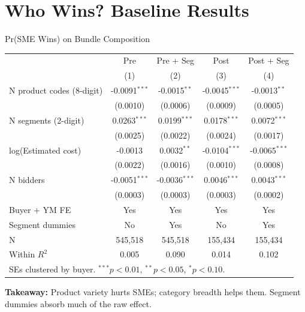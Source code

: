 \documentclass[9pt,aspectratio=169]{beamer}
\begin{document}
\section{Who Wins? Baseline Results}


\begin{frame}{Pr(SME Wins) on Bundle Composition}
\centering\small
\begin{tabular}{lcccc}
\toprule
 & Pre & Pre + Seg & Post & Post + Seg \\
 & (1) & (2) & (3) & (4) \\
\midrule
N product codes (8-digit) & -0.0091$^{***}$ & -0.0015$^{**}$ & -0.0045$^{***}$ & -0.0013$^{**}$ \\
 & (0.0010) & (0.0006) & (0.0009) & (0.0005) \\[2pt]
N segments (2-digit) & 0.0263$^{***}$ & 0.0199$^{***}$ & 0.0178$^{***}$ & 0.0072$^{***}$ \\
 & (0.0025) & (0.0022) & (0.0024) & (0.0017) \\[2pt]
log(Estimated cost) & -0.0013 & 0.0032$^{**}$ & -0.0104$^{***}$ & -0.0065$^{***}$ \\
 & (0.0022) & (0.0016) & (0.0010) & (0.0008) \\[2pt]
N bidders & -0.0051$^{***}$ & -0.0036$^{***}$ & 0.0046$^{***}$ & 0.0043$^{***}$ \\
 & (0.0003) & (0.0003) & (0.0003) & (0.0002) \\[2pt]
\midrule
Buyer + YM FE & Yes & Yes & Yes & Yes \\
Segment dummies & No & Yes & No & Yes \\
N & 545,518 & 545,518 & 155,434 & 155,434 \\
Within $R^2$ & 0.005 & 0.090 & 0.014 & 0.102 \\
\bottomrule
\multicolumn{5}{l}{\footnotesize SEs clustered by buyer. $^{***}p<0.01$, $^{**}p<0.05$, $^{*}p<0.10$.} \\
\end{tabular}

\medskip
\small\textbf{Takeaway:} Product variety hurts SMEs; category breadth helps them. Segment dummies absorb much of the raw effect.
\end{frame}
\end{document}
